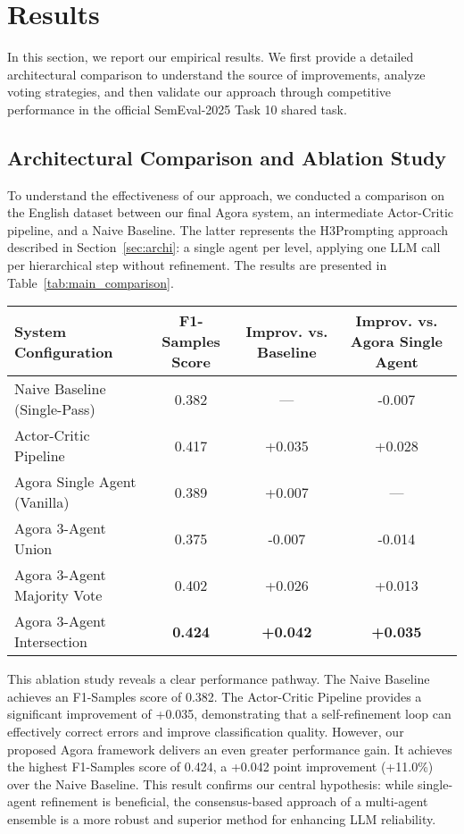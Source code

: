 \section{Results}

In this section, we report our empirical results. We first provide a detailed architectural comparison to understand the source of improvements, analyze voting strategies, and then validate our approach through competitive performance in the official SemEval-2025 Task 10 shared task.

\subsection{Architectural Comparison and Ablation Study}

To understand the effectiveness of our approach, we conducted a comparison on the English dataset between our final Agora system, an intermediate Actor-Critic pipeline, and a Naive Baseline. The latter represents the H3Prompting approach described in Section~\ref{sec:archi}: a single agent per level, applying one LLM call per hierarchical step without refinement. The results are presented in Table~\ref{tab:main_comparison}.

\begin{table*}[ht]
\centering
\caption{Main Performance Comparison on the English Dataset (F1-Samples).}
\label{tab:main_comparison}
\small
\begin{tabular}{lccc}
\hline
\textbf{System Configuration} & \textbf{F1-Samples Score} & \textbf{Improv. vs. Baseline} & \textbf{Improv. vs. Agora Single Agent} \\
\hline
Naive Baseline (Single-Pass) & 0.382 & --- & -0.007\\
Actor-Critic Pipeline & 0.417 & +0.035 & +0.028\\ \hline
Agora Single Agent (Vanilla) & 0.389 & +0.007 & ---\\
Agora 3-Agent Union & 0.375 & -0.007 & -0.014\\
Agora 3-Agent Majority Vote & 0.402 & +0.026 &  +0.013\\
Agora 3-Agent Intersection & \textbf{0.424} & \textbf{+0.042} & \textbf{+0.035}\\
\hline
\end{tabular}
\end{table*}

This ablation study reveals a clear performance pathway. The Naive Baseline achieves an F1-Samples score of 0.382. 
The Actor-Critic Pipeline provides a significant improvement of +0.035, demonstrating that a self-refinement loop can effectively correct errors and improve classification quality. 
However, our proposed Agora framework delivers an even greater performance gain. It achieves the highest F1-Samples score of 0.424, a +0.042 point improvement (+11.0\%) over the Naive Baseline. This result confirms our central hypothesis: while single-agent refinement is beneficial, the consensus-based approach of a multi-agent ensemble is a more robust and superior method for enhancing LLM reliability.

